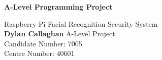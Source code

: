\documentclass[9pt]{article}
\begin{document}
	
	\begin{titlepage}
		\begin{center}
			\vspace*{1cm}
			
			\Huge
			\textbf{A-Level Programming Project}
			
			\vspace{0.5cm}
			\normalsize
			Raspberry Pi Facial Recognition Security System
			\vspace{1.5cm} \\
			\textbf{Dylan Callaghan}
			\vfill
			\vspace{0.8cm}
			\normalsize
			A-Level Project\\
			Candidate Number: 7005\\
			Centre Number: 40601
		\end{center}
	\end{titlepage}
\tableofcontents






\newpage
\end{document}
